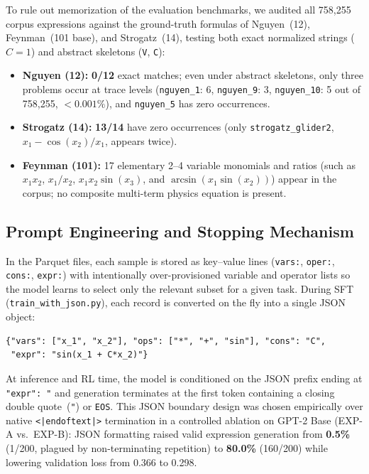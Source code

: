 To rule out memorization of the evaluation benchmarks, we audited all 758{,}255 corpus expressions against the ground-truth formulas of Nguyen~(12), Feynman~(101 base), and Strogatz~(14), testing both exact normalized strings ($C=1$) and abstract skeletons (\texttt{V}, \texttt{C}):
\begin{itemize}
    \item \textbf{Nguyen (12):} \textbf{0/12} exact matches; even under abstract skeletons, only three problems occur at trace levels (\texttt{nguyen\_1}: 6, \texttt{nguyen\_9}: 3, \texttt{nguyen\_10}: 5 out of 758{,}255, $<0.001\%$), and \texttt{nguyen\_5} has zero occurrences.
    \item \textbf{Strogatz (14):} \textbf{13/14} have zero occurrences (only \texttt{strogatz\_glider2}, $x_1 - \cos(x_2)/x_1$, appears twice).
    \item \textbf{Feynman (101):} 17 elementary 2--4 variable monomials and ratios (such as $x_1 x_2$, $x_1/x_2$, $x_1 x_2 \sin(x_3)$, and $\arcsin(x_1 \sin(x_2))$) appear in the corpus; no composite multi-term physics equation is present.
\end{itemize}

\subsection{Prompt Engineering and Stopping Mechanism}
\label{sec:prompt_engineering}

In the Parquet files, each sample is stored as key--value lines (\texttt{vars:}, \texttt{oper:}, \texttt{cons:}, \texttt{expr:}) with intentionally over-provisioned variable and operator lists so the model learns to select only the relevant subset for a given task. During SFT (\texttt{train\_with\_json.py}), each record is converted on the fly into a single JSON object:
\begin{verbatim}
{"vars": ["x_1", "x_2"], "ops": ["*", "+", "sin"], "cons": "C",
 "expr": "sin(x_1 + C*x_2)"}
\end{verbatim}
At inference and RL time, the model is conditioned on the JSON prefix ending at \texttt{"expr": "} and generation terminates at the first token containing a closing double quote~(\texttt{"}) or \texttt{EOS}. This JSON boundary design was chosen empirically over native \texttt{<|endoftext|>} termination in a controlled ablation on GPT-2 Base (EXP-A vs.\ EXP-B): JSON formatting raised valid expression generation from \textbf{0.5\%} (1/200, plagued by non-terminating repetition) to \textbf{80.0\%} (160/200) while lowering validation loss from 0.366 to 0.298.

